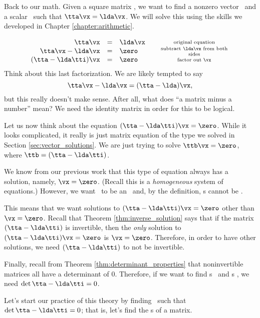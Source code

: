Back to our math. Given a square matrix \tta, we want to find a nonzero vector \vx\ and a scalar \lda\ such that $\tta\vx = \lda\vx$. We will solve this using the skills we developed in Chapter \ref{chapter:arithmetic}.

\[
\begin{array}{rclcc}
\tta\vx & = & \lda\vx & &\parbox{100pt}{\centering\scriptsize original equation}\\
\tta\vx - \lda\vx & = & \zero & & \parbox{100pt}{\centering\scriptsize subtract $\lda\vx$ from both sides}\\
(\tta-\lda\tti)\vx & = & \zero & & \parbox{100pt}{\centering\scriptsize factor out \vx}\\
\end{array}
\]
Think about this last factorization. We are likely tempted to say 
\[
\tta\vx-\lda\vx = (\tta-\lda)\vx,
\]
but this really doesn't make sense. After all, what does ``a matrix minus a number'' mean? We need the identity matrix in order for this to be logical. 

Let us now think about the equation $(\tta-\lda\tti)\vx=\zero$. While it looks complicated, it really is just matrix equation of the type we solved in Section \ref{sec:vector_solutions}. We are just trying to solve $\ttb\vx=\zero$, where $\ttb = (\tta-\lda\tti)$.

We know from our previous work that this type of equation always has a solution, namely, $\vx = \zero$. (Recall this is a \textit{homogeneous} system of equations.) However, we want \vx\ to be an \ev\ and, by the definition, \ev s cannot be \zero. 

This means that we want solutions to $(\tta-\lda\tti)\vx=\zero$ other than $\vx=\zero$. Recall that Theorem \ref{thm:inverse_solution} says that if the matrix $(\tta-\lda\tti)$ is invertible, then the \textit{only} solution to $(\tta-\lda\tti)\vx=\zero$ is $\vx=\zero$. Therefore, in order to have other solutions, we need $(\tta-\lda\tti)$ to not be invertible. 

Finally, recall from Theorem \ref{thm:determinant_properties} that noninvertible matrices all have a determinant of 0. Therefore, if we want to find \el s \lda\ and \ev s \vx, we need $\det{\tta-\lda\tti} = 0$.

Let's start our practice of this theory by finding \lda\ such that $\det{\tta-\lda\tti} = 0$; that is, let's find the \el s of a matrix.

\medskip

